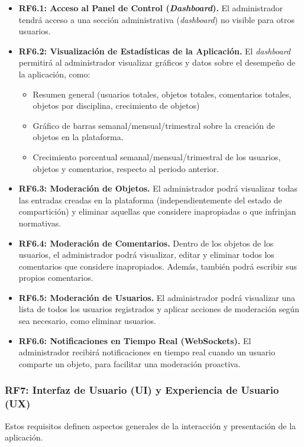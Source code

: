 \begin{itemize}
    \item \textbf{RF6.1: Acceso al Panel de Control (\textit{Dashboard}).} El administrador tendrá acceso a una sección administrativa (\textit{dashboard}) no visible para otros usuarios.
    \item \textbf{RF6.2: Visualización de Estadísticas de la Aplicación.} El \textit{dashboard} permitirá al administrador visualizar gráficos y datos sobre el desempeño de la aplicación, como:
    \begin{itemize}
        \item Resumen general (usuarios totales, objetos totales, comentarios totales, objetos por disciplina, crecimiento de objetos)
        \item Gráfico de barras semanal/mensual/trimestral sobre la creación de objetos en la plataforma.
        \item Crecimiento porcentual semanal/mensual/trimestral de los usuarios, objetos y comentarios, respecto al periodo anterior.
    \end{itemize}
    \item \textbf{RF6.3: Moderación de Objetos.} El administrador podrá visualizar todas las entradas creadas en la plataforma (independientemente del estado de compartición) y eliminar aquellas que considere inapropiadas o que infrinjan normativas.
    \item \textbf{RF6.4: Moderación de Comentarios.} Dentro de los objetos de los usuarios, el administrador podrá visualizar, editar y eliminar todos los comentarios que considere inapropiados. Además, también podrá escribir sus propios comentarios.
    \item \textbf{RF6.5: Moderación de Usuarios.} El administrador podrá visualizar una lista de todos los usuarios registrados y aplicar acciones de moderación según sea necesario, como eliminar usuarios.
    \item \textbf{RF6.6: Notificaciones en Tiempo Real (WebSockets).} El administrador recibirá notificaciones en tiempo real cuando un usuario comparte un objeto, para facilitar una moderación proactiva.
\end{itemize}

\subsubsection{RF7: Interfaz de Usuario (UI) y Experiencia de Usuario (UX)}
\label{rf:uiUx}
Estos requisitos definen aspectos generales de la interacción y presentación de la aplicación.

